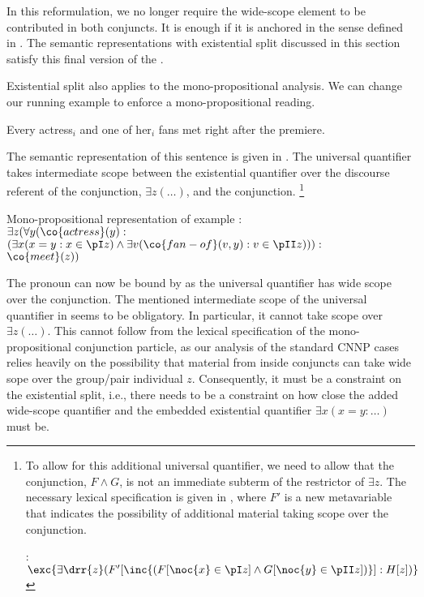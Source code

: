 \documentclass[output=paper]{langsci/langscibook}
\begin{document}
In this reformulation, we no longer require the wide-scope element to be contributed in both conjuncts. It is enough if it is anchored in the sense defined in .
The semantic representations with existential split discussed in this section satisfy this final version of the \CCB.

\begin{sloppypar}
  Existential split also applies to the mono-propositional analysis.
  We can change our running example to enforce a mono-propositional
  reading.
\end{sloppypar}
\ea \label{ex-every-ana2}
Every actress$_i$ and one of her$_i$ fans met right after the premiere.
\z 

The semantic representation of this sentence is given in .
The universal quantifier takes intermediate scope between the existential quantifier over the discourse referent of the conjunction, $\exists z(\ldots)$, and the conjunction.%
\footnote{To allow for this additional universal quantifier, we need to allow that the conjunction, $F \land G$, is not an immediate subterm of the restrictor of $\exists z$.
The necessary lexical specification is given in , where $F'$ is a new metavariable that indicates the possibility of additional material taking scope over the conjunction.

\ea \label{le-mono-and-split}
: $\exc{\exists \drr{z} (F'[\inc{(F[\noc{x} \in \pI z]
\land G[\noc{y} \in \pII z])}]
: H[z])}$
\z}

\ea \label{mono-every-ana2}
Mono-propositional representation of example :\\[1ex]
$\exists z (
\forall y (\co{actress}(y) : $\\
\hspace*{\fill}$(\exists x (x = y : x \in \pI z)
\land
\exists v (\co{fan-of}(v,y) : v \in \pII z)
)) : \qquad\qquad$\\
\hspace*{\fill}$\co{meet}(z))$
\z 

The pronoun  can now be bound by  as the universal quantifier has wide scope over the conjunction. %
%
The mentioned intermediate scope of the universal quantifier in   seems to be obligatory. 
In particular, it cannot take scope over $\exists z (\ldots)$. 
This cannot follow from the lexical specification of the mono-propositional conjunction particle, as our analysis of the standard CNNP cases relies heavily on the possibility that material from inside conjuncts can take wide sope over the group/pair individual $z$. 
Consequently, it must be a constraint on the existential split, i.e., there needs to be a constraint on how close the added wide-scope quantifier and the embedded existential quantifier $\exists x (x=y: \ldots)$ must be. 
\end{document}
